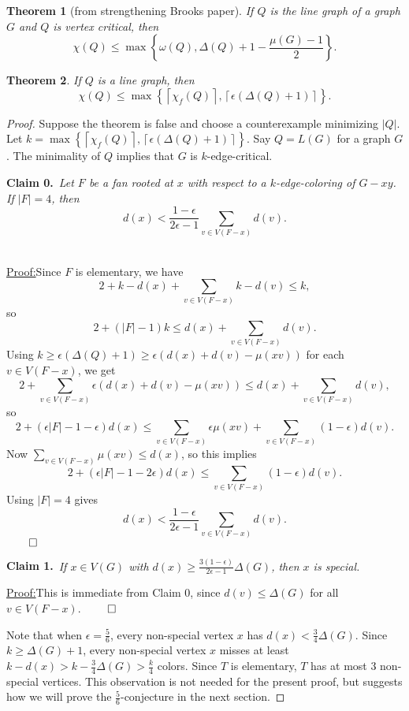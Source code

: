 \documentclass[12pt]{amsart}
\theoremstyle{plain}
\newtheorem{thm}{Theorem}
\theoremstyle{definition}
\theoremstyle{remark}
\newcommand{\set}[1]{\left\{ #1 \right\}}
\newcommand{\card}[1]{\left|#1\right|}
\newcommand{\ceil}[1]{\left\lceil#1\right\rceil}
\newcommand{\parens}[1]{\left( #1 \right)}
\newcommand{\claim}[2]{{\noindent\bf Claim #1.}~{\it #2}~~}
\newenvironment{claimproof}[1]{\par\noindent\underline{Proof:}\space#1}{\leavevmode\unskip\penalty9999
\hbox{}\nobreak\hfill\quad\hbox{$\qed$}}
\begin{document}
\begin{thm}[from strengthening Brooks paper]\label{CriticalMuBound}
If $Q$ is the line graph of a graph $G$ and $Q$ is vertex critical, then
\[\chi(Q) \leq \max\left\{\omega(Q), \Delta(Q) + 1 - \frac{\mu(G) - 1}{2}\right\}.\]
\end{thm}

\begin{thm}
If $Q$ is a line graph, then
\[\chi(Q) \le \max\set{\ceil{\chi_f(Q)}, \ceil{\epsilon(\Delta(Q) + 1)}}.\]
\end{thm}
\begin{proof}
Suppose the theorem is false and choose a counterexample minimizing $\card{Q}$.
Let $k = \max\set{\ceil{\chi_f(Q)}, \ceil{\epsilon(\Delta(Q) + 1)}}$. Say $Q =
L(G)$ for a graph $G$. The minimality of $Q$ implies that $G$ is $k$-edge-critical.

\claim{0}{Let $F$ be a fan rooted at $x$ with respect to a $k$-edge-coloring of $G - xy$.  If $|F| = 4$, then
\[d(x) < \frac{1-\epsilon}{2\epsilon -1}\sum_{v \in V(F-x)} d(v).\]}
\begin{claimproof}
Since $F$ is elementary, we have
\[2 + k-d(x) + \sum_{v \in V(F-x)} k - d(v) \le k,\]
so
\[2 + (|F| - 1)k \le d(x) + \sum_{v \in V(F-x)} d(v).\]
Using $k \ge \epsilon(\Delta(Q) + 1) \ge \epsilon(d(x) + d(v) - \mu(xv))$ for each $v \in V(F-x)$, we get
\[2 + \sum_{v \in V(F-x)}\epsilon(d(x) + d(v) - \mu(xv)) \le d(x) + \sum_{v \in V(F-x)} d(v),\]
so
\[2 + \parens{\epsilon|F| - 1 - \epsilon}d(x) \le \sum_{v \in V(F-x)} \epsilon\mu(xv) + \sum_{v \in V(F-x)} (1-\epsilon)d(v).\]
Now $\sum_{v \in V(F-x)} \mu(xv) \le d(x)$, so this implies
\[2 + \parens{\epsilon|F| - 1 - 2\epsilon}d(x) \le \sum_{v \in V(F-x)} (1-\epsilon)d(v).\]
Using $|F| = 4$ gives
\[d(x) < \frac{1-\epsilon}{2\epsilon -1}\sum_{v \in V(F-x)} d(v).\]
\end{claimproof}
\bigskip

\claim{1}{If $x \in V(G)$ with $d(x) \ge \frac{3(1-\epsilon)}{2\epsilon -1}\Delta(G)$, then $x$ is special.}

\begin{claimproof}
This is immediate from Claim 0, since $d(v)\le \Delta(G)$ for all $v\in V(F-x)$.
\end{claimproof}
\bigskip

Note that when $\epsilon=\frac56$, every non-special vertex $x$ has
$d(x)<\frac34\Delta(G)$.  Since $k\ge \Delta(G)+1$, every non-special vertex $x$ misses
at least $k-d(x)> k-\frac34\Delta(G)> \frac{k}4$ colors.
Since $T$ is elementary, $T$ has at most 3 non-special vertices.
This observation is not needed for the present proof, but suggests how we will
prove the $\frac56$-conjecture in the next section.
\bigskip


\end{proof}
\end{document}
